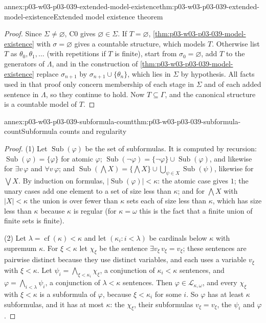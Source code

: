 \begin{annexitem}{annex:p03-w03-p03-039-extended-model-existence}{thm:p03-w03-p03-039-extended-model-existence}{Extended model existence theorem}
\begin{proof}
Since \(\Sigma\ne\varnothing\), C0 gives \(\varnothing\in\Sigma\). If
\(T=\varnothing\), \cref{thm:p03-w03-p03-039-model-existence} with
\(\sigma=\varnothing\) gives a countable structure, which models \(T\).
Otherwise list \(T\) as \(\theta_0,\theta_1,\ldots\) (with repetitions if
\(T\) is finite), start from \(\sigma_0=\varnothing\), add \(T\) to the
generators of \(\Lambda\), and in the construction of
\cref{thm:p03-w03-p03-039-model-existence} replace \(\sigma_{n+1}\) by
\(\sigma_{n+1}\cup\{\theta_n\}\), which lies in \(\Sigma\) by hypothesis.
All facts used in that proof only concern membership of each stage in
\(\Sigma\) and of each added sentence in \(\Lambda\), so they continue to
hold. Now \(T\subseteq\Gamma\), and the canonical structure is a countable
model of \(T\).
\end{proof}
\end{annexitem}

\begin{annexitem}{annex:p03-w03-p03-039-subformula-count}{thm:p03-w03-p03-039-subformula-count}{Subformula counts and regularity}
\begin{proof}
(1) Let \(\operatorname{Sub}(\varphi)\) be the set of subformulas. It is
computed by recursion: \(\operatorname{Sub}(\varphi)=\{\varphi\}\) for atomic
\(\varphi\);
\(\operatorname{Sub}(\neg\varphi)=\{\neg\varphi\}\cup\operatorname{Sub}(\varphi)\),
and likewise for \(\exists v\,\varphi\) and \(\forall v\,\varphi\); and
\(\operatorname{Sub}(\bigwedge X)=\{\bigwedge X\}\cup\bigcup_{\psi\in X}\operatorname{Sub}(\psi)\),
likewise for \(\bigvee X\). By induction on formulas,
\(\lvert\operatorname{Sub}(\varphi)\rvert<\kappa\): the atomic case gives
\(1\); the unary cases add one element to a set of size less than \(\kappa\);
and for \(\bigwedge X\) with \(\lvert X\rvert<\kappa\) the union is over fewer
than \(\kappa\) sets each of size less than \(\kappa\), which has size less
than \(\kappa\) because \(\kappa\) is regular (for \(\kappa=\omega\) this is
the fact that a finite union of finite sets is finite).

(2) Let \(\lambda=\operatorname{cf}(\kappa)<\kappa\) and let
\((\kappa_i:i<\lambda)\) be cardinals below \(\kappa\) with supremum
\(\kappa\). For \(\xi<\kappa\) let \(\chi_\xi\) be the sentence
\(\exists v_\xi\,v_\xi=v_\xi\); these sentences are pairwise distinct
because they use distinct variables, and each uses a variable \(v_\xi\) with
\(\xi<\kappa\). Let \(\psi_i=\bigwedge_{\xi<\kappa_i}\chi_\xi\), a conjunction
of \(\kappa_i<\kappa\) sentences, and \(\varphi=\bigwedge_{i<\lambda}\psi_i\),
a conjunction of \(\lambda<\kappa\) sentences. Then
\(\varphi\in\mathcal L_{\kappa,\omega}\), and every \(\chi_\xi\) with
\(\xi<\kappa\) is a subformula of \(\varphi\), because \(\xi<\kappa_i\) for
some \(i\). So \(\varphi\) has at least \(\kappa\) subformulas, and it has at
most \(\kappa\): the \(\chi_\xi\), their subformulas \(v_\xi=v_\xi\), the
\(\psi_i\) and \(\varphi\).
\end{proof}
\end{annexitem}

